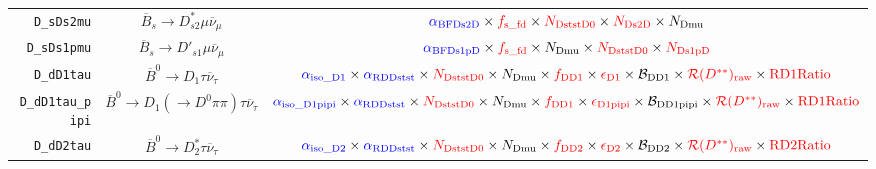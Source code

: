 \begin{landscape}
\begin{table}
\begin{tabular}{r|c|c}
       \texttt{D\_sDs2mu} &             $\overline{B}_s \rightarrow D_{s2}^* \mu \overline{\nu}_\mu$             &                                                                                               $\textcolor{blue}{\alpha_\text{BFDs2D}} \times \textcolor{red}{f_\text{s\_fd}} \times \textcolor{red}{N_\text{DststD0}} \times \textcolor{red}{N_\text{Ds2D}} \times N_\text{Dmu}$                                                                                               \\
      \texttt{D\_sDs1pmu} &             $\overline{B}_s \rightarrow D'_{s1} \mu \overline{\nu}_\mu$              &                                                                                              $\textcolor{blue}{\alpha_\text{BFDs1pD}} \times \textcolor{red}{f_\text{s\_fd}} \times N_\text{Dmu} \times \textcolor{red}{N_\text{DststD0}} \times \textcolor{red}{N_\text{Ds1pD}}$                                                                                              \\
       \texttt{D\_dD1tau} &              $\overline{B}^0 \rightarrow D_1 \tau \overline{\nu}_\tau$               &       $\textcolor{blue}{\alpha_\text{iso\_D1}} \times \textcolor{blue}{\alpha_\text{RDDstst}} \times \textcolor{red}{N_\text{DststD0}} \times N_\text{Dmu} \times \textcolor{red}{f_\text{DD1}} \times \textcolor{red}{\epsilon_\text{D1}} \times \mathcal{B}_\text{DD1} \times \textcolor{red}{\mathcal{R}(D^{**})_\text{raw}} \times \textcolor{red}{\text{RD1Ratio}}$       \\
 \texttt{D\_dD1tau\_pipi} &  $\overline{B}^0 \rightarrow D_1 (\rightarrow D^0 \pi\pi) \tau \overline{\nu}_\tau$  & $\textcolor{blue}{\alpha_\text{iso\_D1pipi}} \times \textcolor{blue}{\alpha_\text{RDDstst}} \times \textcolor{red}{N_\text{DststD0}} \times N_\text{Dmu} \times \textcolor{red}{f_\text{DD1}} \times \textcolor{red}{\epsilon_\text{D1pipi}} \times \mathcal{B}_\text{DD1pipi} \times \textcolor{red}{\mathcal{R}(D^{**})_\text{raw}} \times \textcolor{red}{\text{RD1Ratio}}$ \\
       \texttt{D\_dD2tau} &             $\overline{B}^0 \rightarrow D^*_2 \tau \overline{\nu}_\tau$              &       $\textcolor{blue}{\alpha_\text{iso\_D2}} \times \textcolor{blue}{\alpha_\text{RDDstst}} \times \textcolor{red}{N_\text{DststD0}} \times N_\text{Dmu} \times \textcolor{red}{f_\text{DD2}} \times \textcolor{red}{\epsilon_\text{D2}} \times \mathcal{B}_\text{DD2} \times \textcolor{red}{\mathcal{R}(D^{**})_\text{raw}} \times \textcolor{red}{\text{RD2Ratio}}$       \\

\end{tabular}
\end{table}
\end{landscape}
